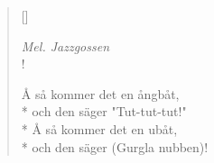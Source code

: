 
\settowidth{\versewidth}{Å så kommer det en ångbåt,}



\begin{verse}[\versewidth]

\flagverse{}
\emph{Mel. Jazzgossen}\\!


Å så kommer det en ångbåt,\\*
och den säger "Tut-tut-tut!"\\*
Å så kommer det en ubåt,\\*
och den säger (Gurgla nubben)!


\end{verse}


